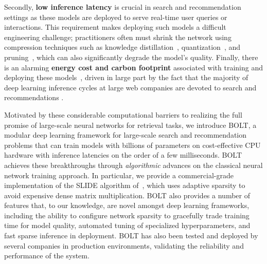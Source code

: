 \documentclass[sigconf]{acmart}
\begin{document}
Secondly, \textbf{low inference latency} is crucial in search and recommendation settings as these models are deployed to serve real-time user queries or interactions. This requirement makes deploying such models a difficult engineering challenge; practitioners often must shrink the network using compression techniques such as knowledge distillation~\cite{hinton2015distilling}, quantization~\cite{han2015deep}, and pruning~\cite{blalock2020state}, which can also significantly degrade the model's quality. Finally, there is an alarming \textbf{energy cost and carbon footprint} associated with training and deploying these models~\cite{strubell2019energy}, driven in large part by the fact that the majority of deep learning inference cycles at large web companies are devoted to search and recommendations \cite{gupta2020architectural}.

Motivated by these considerable computational barriers to realizing the full promise of large-scale neural networks for retrieval tasks, we introduce BOLT, a modular deep learning framework for large-scale search and recommendation problems that can train models with billions of parameters on cost-effective CPU hardware with inference latencies on the order of a few milliseconds. BOLT achieves these breakthroughs through \emph{algorithmic} advances on the classical neural network training approach. In particular, we provide a commercial-grade implementation of the SLIDE algorithm of~\cite{spring2017scalable,chen2020slide}, which uses adaptive sparsity to avoid expensive dense matrix multiplication. BOLT also provides a number of features that, to our knowledge, are novel amongst deep learning frameworks, including the ability to configure network sparsity to gracefully trade training time for model quality, automated tuning of specialized hyperparameters, and fast sparse inference in deployment. \textsc{BOLT} has also been tested and deployed by several companies in production environments, validating the reliability and performance of the system. 
\end{document}
